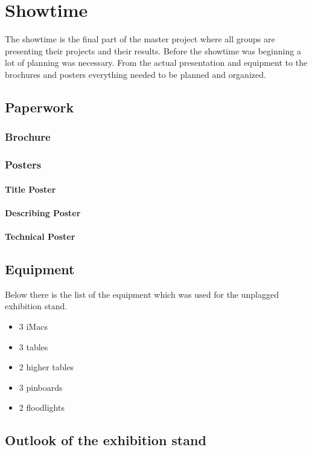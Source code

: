 \chapter{Showtime}\label{chap:Showtime}

The showtime is the final part of the master project where all groups are presenting their projects and their results.
Before the showtime was beginning a lot of planning was necessary. From the actual presentation and equipment to the brochures and posters everything needed to be planned and organized.

\section{Paperwork}

\subsection{Brochure}

\subsection{Posters}

\subsubsection{Title Poster}

\subsubsection{Describing Poster}

\subsubsection{Technical Poster}


\section{Equipment}
Below there is the list of the equipment which was used for the unplagged exhibition stand.

\begin{itemize}
\item 3 iMacs
\item 3 tables
\item 2 higher tables
\item 3 pinboards
\item 2 floodlights
\end{itemize}

\section{Outlook of the exhibition stand}



